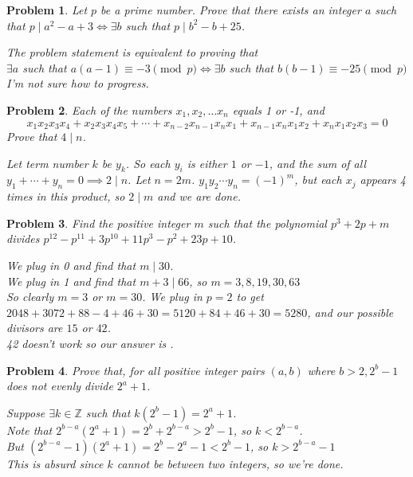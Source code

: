 \documentclass{scrartcl}
\newtheorem{a_problem}{Problem}
\begin{document}
\begin{a_problem}
	Let $p$ be a prime number. Prove that there exists an integer $a$ such that $p \mid a^2 - a + 3 \iff \exists b$ such that $p \mid b^2 - b + 25$.
	\begin{soln}
		The problem statement is equivalent to proving that \\
		$\exists a$ such that $a(a-1) \equiv -3 \pmod{p} \iff \exists b$ such that $b(b-1) \equiv -25 \pmod{p}$ \\
		I'm not sure how to progress.
	\end{soln}
\end{a_problem}

\begin{a_problem}
	Each of the numbers $x_1, x_2,\dots x_n$ equals 1 or -1, and
	\[x_1x_2x_3x_4 + x_2x_3x_4x_5 + \cdots + x_{n-2}x_{n-1}x_{n}x_1 + x_{n-1}x_{n}x_1x_2 + x_{n}x_1x_2x_3 = 0\]
	Prove that $4 \mid n$.
	\begin{soln}
		Let term number $k$ be $y_k$. So each $y_i$ is either $1$ or $-1$, and the sum of all $y_1 + \cdots + y_n = 0 \implies 2 \mid n$. Let $n=2m$. $y_1 y_2 \cdots y_n = {\left(-1\right)}^m$, but each $x_j$ appears 4 times in this product, so $2 \mid m$ and we are done.
	\end{soln}
\end{a_problem}

\setcounter{a_problem}{397}
\begin{a_problem}
Find the positive integer $m$ such that the polynomial $p^3 + 2p + m$ divides $p^{12} - p^{11} + 3p^{10} + 11p^3 - p^2 + 23p + 10$.
	\begin{soln}
		We plug in 0 and find that $m \mid 30$. \\
		We plug in 1 and find that $m + 3 \mid 66$, so $m = 3,8,19,30,63$ \\
		So clearly $m = 3$ or $m = 30$.
		We plug in $p=2$ to get $2048 + 3072 + 88 - 4 + 46 + 30 = 5120 + 84 + 46 + 30 = 5280$, and our possible divisors are $15$ or $42$. \\
		42 doesn't work so our answer is .
	\end{soln}
\end{a_problem}
\begin{a_problem}
	Prove that, for all positive integer pairs $(a,b)$ where $b>2, 2^b - 1$ does not evenly divide $2^a + 1$.
	\begin{soln}
		Suppose $\exists k \in \mathbb{Z}$ such that $k(2^b - 1) = 2^a + 1$. \\
		Note that $2^{b-a}\left( 2^a +1\right) = 2^b + 2^{b-a} > 2^b - 1$, so $k < 2^{b-a}$. \\
		But $\left(2^{b-a} - 1\right)\left(2^a + 1\right) = 2^b - 2^a - 1 < 2^b - 1$, so $k > 2^{b-a}-1$ \\
		This is absurd since $k$ cannot be between two integers, so we're done.

	\end{soln}
\end{a_problem}
\end{document}
